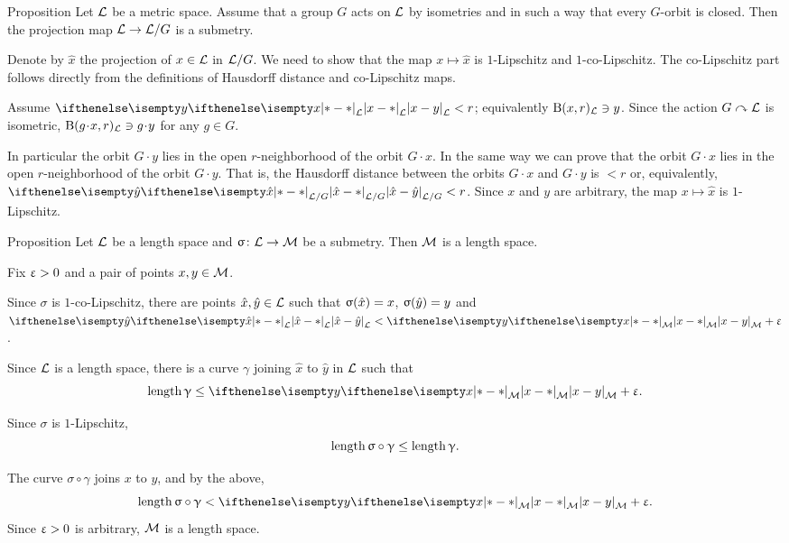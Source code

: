 \begin{thm}{Proposition}\label{prop:submet/G}
Let $\mathcal{L}$ be a metric space.
Assume that a group $G$  acts on $\mathcal{L}$ by isometries  
and in such a way that every $G$-orbit is closed.
Then the projection map $\spc{L}\to \spc{L}/G$ is a submetry.
\end{thm}

Denote by $\hat x$ the projection of $x\in \spc{L}$ in $\mathcal{L}/G$.
We need to show that the map $x\mapsto\hat x$ is $1$-Lipschitz and $1$-co-Lipschitz.
The co-Lipschitz part follows directly from the definitions of Hausdorff distance and co-Lipschitz maps.

Assume $\dist{x}{y}{\spc{L}}< r$; equivalently $\mathrm{B}{}(x,r)_{\mathcal{L}}\ni y$.
Since the action $G\curvearrowright \mathcal{L}$ is isometric, 
$\oBall(g\cdot x,r)_{\spc{L}}\ni g\cdot y$ for any $g\in G$.

In particular the orbit $G\cdot y$ lies in the open $r$-neighborhood of the orbit $G\cdot x$.
In the same way we can prove that the orbit $G\cdot x$ lies in the open $r$-neighborhood of the orbit $G\cdot y$. 
That is, the Hausdorff distance between the orbits $G\cdot x$ and $G\cdot y$ is  $<r$
or, equivalently, $\dist{\hat x}{\hat y}{\spc{L}/G}< r$.
Since $x$ and $y$ are arbitrary, the map $x\mapsto\hat x$ is $1$-Lipschitz.
\qeds


\begin{thm}{Proposition}
\label{prop:submet-length}
Let  $\mathcal{L}$ be a length space 
and $\sigma\:\spc{L}\to \spc{M}$ be a submetry.
Then $\mathcal{M}$ is a length space.
\end{thm}

Fix $\upvarepsilon>0$ and a pair of points $x,y\in \spc{M}$.

Since $\sigma$ is $1$-co-Lipschitz, there are points $\hat x,\hat y\in \spc{L}$
such that $\sigma(\hat x)\z=x$, $\sigma(\hat y)\z=y$ 
and $\dist{\hat x}{\hat y}{\spc{L}}<\dist{x}{y}{\spc{M}}+\eps$.

Since ${\mathcal{L}}$ is a length space, 
there is a curve $\gamma$ 
joining $\hat x$ to $\hat y$ in ${\mathcal{L}}$
such that
\[\length\gamma\le \dist{x}{y}{\spc{M}}+\eps.\]

Since $\sigma$ is $1$-Lipschitz,
\[\length\sigma\circ\gamma\le \length\gamma.\]

The curve $\sigma\circ\gamma$ joins $x$ to $y$,
and by the above,
\[\length\sigma\circ\gamma<\dist{x}{y}{\spc{M}}+\eps.\]
Since $\upvarepsilon>0$ is arbitrary,
$\mathcal{M}$ is a length space.
\qeds

